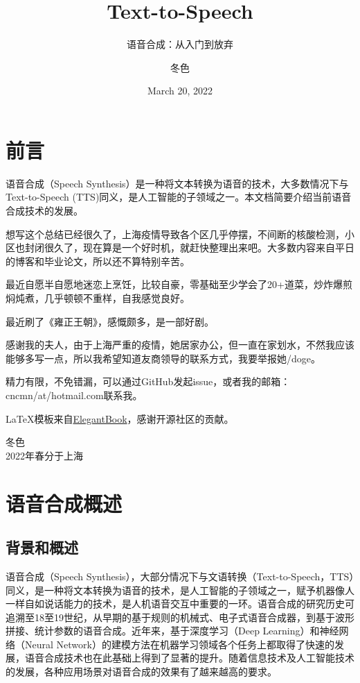 \documentclass[cn,10pt,math=newtx,citestyle=gb7714-2015,bibstyle=gb7714-2015]{elegantbook}
\title{Text-to-Speech}
\subtitle{语音合成：从入门到放弃}
\author{冬色}
\institute{https://github.com/cnlinxi}
\date{March 20, 2022}
\begin{document}
\maketitle
\frontmatter

\chapter*{前言}


语音合成（Speech Synthesis）是一种将文本转换为语音的技术，大多数情况下与Text-to-Speech (TTS)同义，是人工智能的子领域之一。本文档简要介绍当前语音合成技术的发展。

想写这个总结已经很久了，上海疫情导致各个区几乎停摆，不间断的核酸检测，小区也封闭很久了，现在算是一个好时机，就赶快整理出来吧。大多数内容来自平日的博客和毕业论文，所以还不算特别辛苦。

最近自愿半自愿地迷恋上烹饪，比较自豪，零基础至少学会了20+道菜，炒炸爆煎焖炖煮，几乎顿顿不重样，自我感觉良好。

最近刷了《雍正王朝》，感慨颇多，是一部好剧。

感谢我的夫人，由于上海严重的疫情，她居家办公，但一直在家划水，不然我应该能够多写一点，所以我希望知道友商领导的联系方式，我要举报她/doge。

精力有限，不免错漏，可以通过GitHub发起issue，或者我的邮箱：cncmn/at/hotmail.com联系我。

\vskip 0.5cm

\LaTeX{}模板来自\href{https://github.com/ElegantLaTeX/ElegantBook}{ElegantBook}，感谢开源社区的贡献。

\vskip 1.5cm

\begin{flushright}
冬色\\
2022年春分于上海
\end{flushright}

\tableofcontents

\mainmatter

\chapter{语音合成概述}

\section{背景和概述}
语音合成（Speech Synthesis），大部分情况下与文语转换（Text-to-Speech，TTS）同义，是一种将文本转换为语音的技术，是人工智能的子领域之一，赋予机器像人一样自如说话能力的技术，是人机语音交互中重要的一环。语音合成的研究历史可追溯至18至19世纪，从早期的基于规则的机械式、电子式语音合成器，到基于波形拼接、统计参数的语音合成。近年来，基于深度学习（Deep Learning）和神经网络（Neural Network）的建模方法在机器学习领域各个任务上都取得了快速的发展，语音合成技术也在此基础上得到了显著的提升。随着信息技术及人工智能技术的发展，各种应用场景对语音合成的效果有了越来越高的要求。
\end{document}

